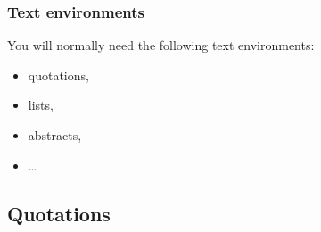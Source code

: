 
\begin{frame}[fragile]
\frametitle{Text environments}
You will normally need the following text environments:

\begin{itemize}
	\item quotations,
	
	\item lists, 
	
	
	\item abstracts,
	
	
	\item \dots 
\end{itemize}

\end{frame}


\subsection{Quotations}

